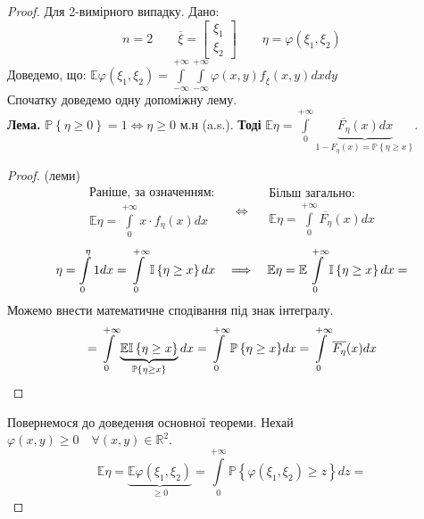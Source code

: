 \begin{proof}
   Для 2-вимірного випадку. Дано:
   $$
   n=2 \qquad \overline{\xi}= \begin{bmatrix}
    \xi_1 \\
    \xi_2
   \end{bmatrix} \qquad \eta = \varphi(\xi_1 , \xi_2)
   $$
   Доведемо, що: $\mathbb{E} \varphi (\xi_1, \xi_2) =  \int\limits_{- \infty}^{ +\infty}{  \int\limits_{-\infty}^{ +\infty}{
   \varphi(x,y) f_{\overline{\xi}} (x,y)dxdy
   }}$\\
   Спочатку доведемо одну допоміжну лему.\\
   \textbf{Лема. } $\mathbb{P} \left\lbrace \eta \geq 0 \right\rbrace = 1 \Longleftrightarrow \eta \geq 0$ м.н (a.s.). \textbf{Тоді }
   $\mathbb{E} \eta  =  \displaystyle\int\limits_{0}^{ +\infty}{\underbrace{\overline{F_\eta} (x) dx}_{1 - F_\eta (x) = \mathbb{P} \left\lbrace \eta \geq x \right\rbrace}}$.
   \begin{proof} (леми)
   $$
   \begin{gathered}
    \text{Раніше, за означенням:}\\
     \mathbb{E} \eta =  \int\limits_{0}^{ +\infty}{x \cdot f_{\eta} (x) dx }
   \end{gathered} \quad \Longleftrightarrow \quad
   \begin{gathered}
    \text{Більш загально:}\\
     \mathbb{E} \eta  =  \int\limits_{0}^{ +\infty}{\overline{F_\eta} (x) dx}
   \end{gathered}
   $$
   $$
   \eta =  \int\limits_{0}^{\eta}{1 dx} =  \int\limits_{0}^{ +\infty}{ \mathbb{I}{}\left\lbrace \eta \geq x \right\rbrace dx}
\quad \Longrightarrow \quad
\mathbb{E} \eta = \mathbb{E} \int\limits_{0}^{ +\infty}{ \mathbb{I}{}\left\lbrace \eta \geq x \right\rbrace dx} =
   $$
   Можемо внести математичне сподівання під знак інтегралу.
   $$
   =  \int\limits_{0}^{ +\infty}{\underbrace{ \mathbb{E}\mathbb{I}{}\left\lbrace \eta \geq x \right\rbrace}_{ \mathbb{P} \left\lbrace \eta \geq x \right\rbrace} dx} =  \int\limits_{0}^{ +\infty}{ \mathbb{P} \left\lbrace \eta \geq x \right\rbrace} dx =  \int\limits_{0}^{ +\infty}{\overline{F_\eta} (x) dx}
   $$
   \end{proof}
   Повернемося до доведення основної теореми. Нехай $ \varphi(x,y) \geq 0 \quad \forall (x,y) \in \mathbb{R}^2.$
   $$
   \mathbb{E} \eta = \underbrace{\mathbb{E} \varphi (\xi_1, \xi_2)}_{ \geq 0 } =  \int\limits_{0}^{ +\infty}{\mathbb{P} \left\lbrace \varphi(\xi_1, \xi_2) \geq z  \right\rbrace dz} =
$$
\end{proof}
